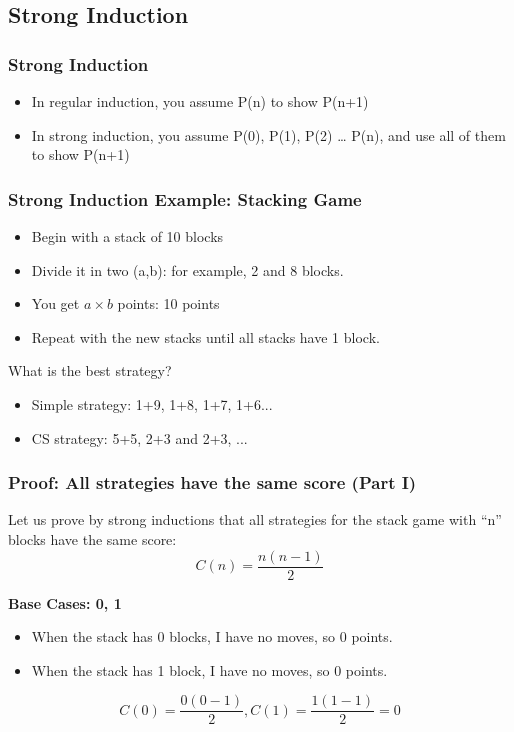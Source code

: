 \subsection{Strong Induction}

\begin{frame}
  \frametitle{Strong Induction}

  {\larger
    \begin{itemize}
    \item In regular induction, you assume P(n) to show P(n+1)

      \bigskip

    \item In strong induction, you assume P(0), P(1), P(2) \ldots
      P(n), and use all of them to show P(n+1)
    \end{itemize}
  }
\end{frame}

\begin{frame}
  \frametitle{Strong Induction Example: Stacking Game}
  {\larger
  \begin{itemize}
  \item Begin with a stack of 10 blocks
  \item Divide it in two (a,b): for example, 2 and 8 blocks.
  \item You get $a\times b$ points: 10 points
  \item Repeat with the new stacks until all stacks have 1 block.
  \end{itemize}

  \bigskip

  \alert{What is the best strategy?}
  \begin{itemize}
  \item Simple strategy: 1+9, 1+8, 1+7, 1+6... 
  \item CS strategy: 5+5, 2+3 and 2+3, ... 
  \end{itemize}
  }
\end{frame}

\begin{frame}
  \frametitle{Proof: All strategies have the same score (Part I)}

  {\larger
  Let us prove by strong inductions that all strategies for the stack
  game with ``n'' blocks have the same score:
  \begin{equation*}
    C(n) = \frac{n(n-1)}{2}
  \end{equation*}

  \bigskip

  {\bf Base Cases: 0, 1}
  \begin{itemize}
  \item When the stack has 0 blocks, I have no moves, so 0 points.
  \item When the stack has 1 block, I have no moves, so 0 points.
  \end{itemize}
  \begin{equation*}
    C(0) = \frac{0(0-1)}{2}, C(1) = \frac{1(1-1)}{2} = 0
  \end{equation*}
  }
\end{frame}

